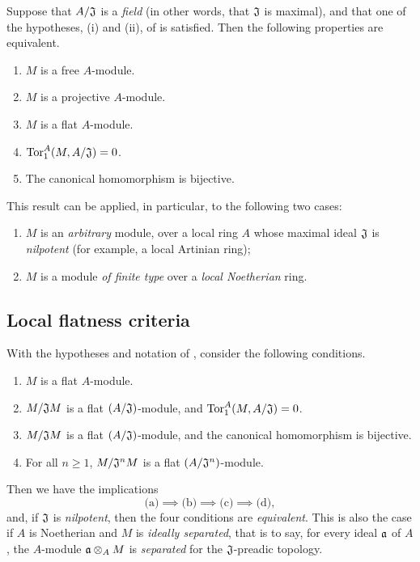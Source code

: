 \begin{env}[10.1.3]
\label{0.10.1.3}
Suppose that $A/\mathfrak{J}$ is a \emph{field} (in other words, that $\mathfrak{J}$ is maximal), and that one of the hypotheses, (i) and (ii), of  is satisfied.
Then the following properties are equivalent.
\begin{enumerate}[label=\emph{(\alph*)}]
  \item $M$ is a free $A$-module.
  \item $M$ is a projective $A$-module.
  \item $M$ is a flat $A$-module.
  \item ${\mathop{\mathrm{Tor}}\nolimits}_1^A(M,A/\mathfrak{J})=0$.
  \item The canonical homomorphism  is bijective.
\end{enumerate}
\end{env}

This result can be applied, in particular, to the following two cases:
\begin{enumerate}[label=(\roman*)]
  \item $M$ is an \emph{arbitrary} module, over a local ring $A$ whose maximal ideal $\mathfrak{J}$ is \emph{nilpotent} (for example, a local Artinian ring);
  \item $M$ is a module \emph{of finite type} over a \emph{local Noetherian} ring.
\end{enumerate}

\subsection{Local flatness criteria}
\label{subsection:0.10.2}

\begin{env}[10.2.1]
\label{0.10.2.1}
With the hypotheses and notation of , consider the following conditions.
\begin{enumerate}[label=\emph{(\alph*)}]
    \item $M$ is a flat $A$-module.
    \item $M/\mathfrak{J}M$ is a flat $(A/\mathfrak{J})$-module, and ${\mathop{\mathrm{Tor}}\nolimits}_1^A(M,A/\mathfrak{J})=0$.
    \item $M/\mathfrak{J}M$ is a flat $(A/\mathfrak{J})$-module, and the canonical homomorphism  is bijective.
    \item For all $n\geq1$, $M/\mathfrak{J}^nM$ is a flat $(A/\mathfrak{J}^n)$-module.
\end{enumerate}

Then we have the implications
\[
    \text{(a)}\implies\text{(b)}\implies\text{(c)}\implies\text{(d)},
\]
and, if $\mathfrak{J}$ is \emph{nilpotent}, then the four conditions are \emph{equivalent}.
This is also the case if $A$ is Noetherian and $M$ is \emph{ideally separated}, that is to say, for every ideal $\mathfrak{a}$ of $A$, the $A$-module $\mathfrak{a}\otimes_A M$ is \emph{separated} for the $\mathfrak{J}$-preadic topology.
\end{env}

